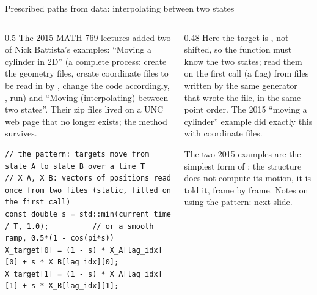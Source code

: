 \documentclass[aspectratio=169,11pt]{beamer}
\begin{document}
\begin{frame}[fragile]{Prescribed paths from data: interpolating between two states}
\label{fr:interp}
\begin{columns}[T,onlytextwidth]
\begin{column}{0.5\textwidth}
\footnotesize The 2015 MATH 769 lectures added two of Nick Battista's examples: ``Moving a cylinder in 2D'' (a complete process: create the geometry files, create coordinate  files to be read in by , change the code accordingly, , run) and ``Moving (interpolating) between two states''. Their zip files lived on a UNC web page that no longer exists; the method survives.
\begin{lstlisting}[style=cpptiny]
// the pattern: targets move from state A to state B over a time T
// X_A, X_B: vectors of positions read once from two files (static, filled on the first call)
const double s = std::min(current_time / T, 1.0);          // or a smooth ramp, 0.5*(1 - cos(pi*s))
X_target[0] = (1 - s) * X_A[lag_idx][0] + s * X_B[lag_idx][0];
X_target[1] = (1 - s) * X_A[lag_idx][1] + s * X_B[lag_idx][1];
\end{lstlisting}
\end{column}
\begin{column}{0.48\textwidth}
\footnotesize Here the target is , not shifted, so the function must know the two states; read them on the first call (a  flag) from files written by the same generator that wrote the  file, in the same point order. The 2015 ``moving a cylinder'' example did exactly this with coordinate  files.
\vspace{1mm}

\footnotesize The two 2015 examples are the simplest form of : the structure does not compute its motion, it is told it, frame by frame. Notes on using the pattern: next slide.
\end{column}
\end{columns}
\end{frame}
\end{document}
